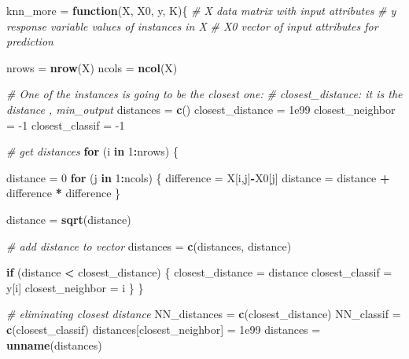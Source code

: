 \documentclass[]{article}
\newenvironment{Shaded}{\begin{snugshade}}{\end{snugshade}}
\newcommand{\CommentTok}[1]{\textcolor[rgb]{0.56,0.35,0.01}{\textit{#1}}}
\newcommand{\ControlFlowTok}[1]{\textcolor[rgb]{0.13,0.29,0.53}{\textbf{#1}}}
\newcommand{\DecValTok}[1]{\textcolor[rgb]{0.00,0.00,0.81}{#1}}
\newcommand{\FloatTok}[1]{\textcolor[rgb]{0.00,0.00,0.81}{#1}}
\newcommand{\KeywordTok}[1]{\textcolor[rgb]{0.13,0.29,0.53}{\textbf{#1}}}
\newcommand{\NormalTok}[1]{#1}
\newcommand{\OperatorTok}[1]{\textcolor[rgb]{0.81,0.36,0.00}{\textbf{#1}}}
\newcommand{\StringTok}[1]{\textcolor[rgb]{0.31,0.60,0.02}{#1}}
\begin{document}
\begin{Shaded}
\begin{Highlighting}[]
\NormalTok{knn_more =}\StringTok{ }\ControlFlowTok{function}\NormalTok{(X, X0, y, K)\{}
  \CommentTok{# X data matrix with input attributes}
  \CommentTok{# y response variable values of instances in X  }
  \CommentTok{# X0 vector of input attributes for prediction}
  
\NormalTok{  nrows =}\StringTok{ }\KeywordTok{nrow}\NormalTok{(X)}
\NormalTok{  ncols =}\StringTok{ }\KeywordTok{ncol}\NormalTok{(X)}
  
  \CommentTok{# One of the instances is going to be the closest one:}
  \CommentTok{# closest_distance: it is the distance , min_output}
\NormalTok{  distances =}\StringTok{ }\KeywordTok{c}\NormalTok{()}
\NormalTok{  closest_distance =}\StringTok{ }\FloatTok{1e99}
\NormalTok{  closest_neighbor =}\StringTok{ }\DecValTok{-1}
\NormalTok{  closest_classif =}\StringTok{ }\DecValTok{-1}
  
  \CommentTok{# get distances}
  \ControlFlowTok{for}\NormalTok{ (i }\ControlFlowTok{in} \DecValTok{1}\OperatorTok{:}\NormalTok{nrows) \{}

\NormalTok{    distance =}\StringTok{ }\DecValTok{0}
    \ControlFlowTok{for}\NormalTok{ (j }\ControlFlowTok{in} \DecValTok{1}\OperatorTok{:}\NormalTok{ncols) \{}
\NormalTok{      difference =}\StringTok{ }\NormalTok{X[i,j]}\OperatorTok{-}\NormalTok{X0[j]}
\NormalTok{      distance =}\StringTok{ }\NormalTok{distance }\OperatorTok{+}\StringTok{ }\NormalTok{difference }\OperatorTok{*}\StringTok{ }\NormalTok{difference}
\NormalTok{    \}}
    
\NormalTok{    distance =}\StringTok{ }\KeywordTok{sqrt}\NormalTok{(distance)}

    \CommentTok{# add distance to vector}
\NormalTok{    distances =}\StringTok{ }\KeywordTok{c}\NormalTok{(distances, distance)}

    \ControlFlowTok{if}\NormalTok{ (distance }\OperatorTok{<}\StringTok{ }\NormalTok{closest_distance) \{}
\NormalTok{      closest_distance =}\StringTok{ }\NormalTok{distance}
\NormalTok{      closest_classif =}\StringTok{ }\NormalTok{y[i]}
\NormalTok{      closest_neighbor =}\StringTok{ }\NormalTok{i}
\NormalTok{    \}}
\NormalTok{  \}}

  \CommentTok{# eliminating closest distance}
\NormalTok{  NN_distances =}\StringTok{ }\KeywordTok{c}\NormalTok{(closest_distance)}
\NormalTok{  NN_classif =}\StringTok{ }\KeywordTok{c}\NormalTok{(closest_classif)}
\NormalTok{  distances[closest_neighbor] =}\StringTok{ }\FloatTok{1e99}
\NormalTok{  distances =}\StringTok{ }\KeywordTok{unname}\NormalTok{(distances)}


\end{Highlighting}
\end{Shaded}
\end{document}
